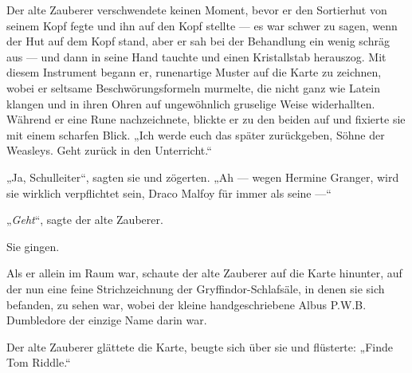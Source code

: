 Der alte Zauberer verschwendete keinen Moment, bevor er den Sortierhut von seinem Kopf fegte und ihn auf den Kopf stellte — es war schwer zu sagen, wenn der Hut auf dem Kopf stand, aber er sah bei der Behandlung ein wenig schräg aus — und dann in seine Hand tauchte und einen Kristallstab herauszog. Mit diesem Instrument begann er, runenartige Muster auf die Karte zu zeichnen, wobei er seltsame Beschwörungsformeln murmelte, die nicht ganz wie Latein klangen und in ihren Ohren auf ungewöhnlich gruselige Weise widerhallten. Während er eine Rune nachzeichnete, blickte er zu den beiden auf und fixierte sie mit einem scharfen Blick.
„Ich werde euch das später zurückgeben, Söhne der Weasleys. Geht zurück in den Unterricht.“

„Ja, Schulleiter“, sagten sie und zögerten.
„Ah — wegen Hermine Granger, wird sie wirklich verpflichtet sein, Draco Malfoy für immer als seine —“

„\emph{Geht}“, sagte der alte Zauberer.

Sie gingen.

Als er allein im Raum war, schaute der alte Zauberer auf die Karte hinunter, auf der nun eine feine Strichzeichnung der Gryffindor-Schlafsäle, in denen sie sich befanden, zu sehen war, wobei der kleine handgeschriebene Albus P.W.B. Dumbledore der einzige Name darin war.

Der alte Zauberer glättete die Karte, beugte sich über sie und flüsterte:
„Finde Tom Riddle.“

